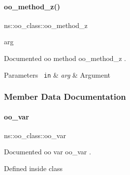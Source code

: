 \paragraph{\texorpdfstring{oo\_method\_z()}{oo\_method\_z()}}
{\footnotesize\ttfamily ns\+::oo\+\_\+class\+::oo\+\_\+method\+\_\+z\begin{DoxyParamCaption}\item[{}]{arg  }\end{DoxyParamCaption}}



Documented oo method {\ttfamily oo\+\_\+method\+\_\+z} . 


\begin{DoxyParams}[1]{Parameters}
\mbox{\texttt{ in}}  & {\em arg} & Argument \\
\hline
\end{DoxyParams}

\begin{DoxyCode}{0}

\end{DoxyCode}


\subsubsection{Member Data Documentation}
\mbox{\label{classns_1_1oo__class_a741f11f4a2db3876205658d4a9a279ba}} 
\paragraph{\texorpdfstring{oo\_var}{oo\_var}}
{\footnotesize\ttfamily ns\+::oo\+\_\+class\+::oo\+\_\+var\hspace{0.3cm}{\ttfamily [static]}}



Documented oo var {\ttfamily oo\+\_\+var} . 

Defined inside class 
\begin{DoxyCode}{0}

\end{DoxyCode}
\mbox{\label{classns_1_1oo__class_af46293ede16067c38ca2901416cad8ee}} 
